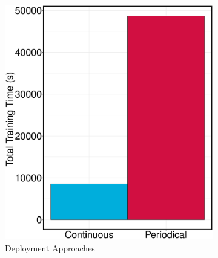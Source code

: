 \begin{figure}[h]
\begin{subfigure}{\columnwidth/2}
\centering
\includegraphics[width=\columnwidth]{../images/experiment-results/criteo-training-time-deployment-types-experiment.eps}
\caption{Deployment Approaches}
\label{fig:training-time-deployment}
\end{subfigure}%
\begin{subfigure}{\columnwidth/2}
\centering

\end{subfigure}
\end{figure}
